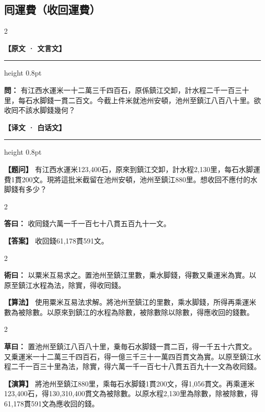 \documentclass[11pt,a4paper]{article}
\newcommand{\ClassicalQuestion}[1]{\par\noindent\textbf{\color{problemcolor}問：}#1\par}
\newcommand{\ClassicalAnswer}[1]{\par\noindent\textbf{\color{answercolor}答曰：}#1\par}
\newcommand{\ClassicalMethod}[1]{\par\noindent\textbf{\color{methodcolor}術曰：}#1\par}
\newcommand{\ClassicalWorking}[1]{\par\noindent\textbf{草曰：}#1\par}
\newcommand{\ModernQuestion}[1]{\par\noindent\textbf{\color{modernlabel}【题问】}#1\par}
\newcommand{\ModernAnswer}[1]{\par\noindent\textbf{\color{answercolor}【答案】}#1\par}
\newcommand{\ModernMethod}[1]{\par\noindent\textbf{\color{methodcolor}【算法】}#1\par}
\newcommand{\ModernWorking}[1]{\par\noindent\textbf{【演算】}#1\par}
\newcommand{\ClassicalHeader}{%
  \begin{center}\textbf{\color{headerclassical}【原文 · 文言文】}\end{center}
  \vspace{-0.5em}
  \hrule height 0.8pt
  \vspace{0.5em}
}
\newcommand{\ModernHeader}{%
  \begin{center}\textbf{\color{headermodern}【译文 · 白话文】}\end{center}
  \vspace{-0.5em}
  \hrule height 0.8pt
  \vspace{0.5em}
}
\begin{document}
\subsection*{\color{sectioncolor}囘運費（收回運費）}

\begin{paracol}{2}

\ClassicalHeader

\ClassicalQuestion{%
有江西水運米一十二萬三千四百石，原係鎮江交卸，計水程二千一百三十里，每石水脚錢一貫二百文。今截上件米就池州安頓，池州至鎮江八百八十里。欲收囘不該水脚錢幾何？}

\switchcolumn

\ModernHeader

\ModernQuestion{%
有江西水運米123,400石，原來到鎮江交卸，計水程2,130里，每石水脚運費1貫200文。現將這批米截留在池州安頓，池州至鎮江880里。想收回不應付的水脚錢有多少？
}

\end{paracol}

\begin{paracol}{2}

\ClassicalAnswer{%
收囘錢六萬一千一百七十八貫五百九十一文。}

\switchcolumn

\ModernAnswer{%
收回錢61,178貫591文。
}

\end{paracol}

\begin{paracol}{2}

\ClassicalMethod{%
以粟米互易求之。置池州至鎮江里數，乗水脚錢，得數又乗運米為實。以原至鎮江水程為法，除實，得收囘錢。}

\switchcolumn

\ModernMethod{%
使用粟米互易法求解。將池州至鎮江的里數，乘水脚錢，所得再乘運米數為被除數。以原來到鎮江的水程為除數，被除數除以除數，得應收回的錢數。
}

\end{paracol}

\begin{paracol}{2}

\ClassicalWorking{%
置池州至鎮江八百八十里，乗毎石水脚錢一貫二百，得一千五十六貫文。又乗運米一十二萬三千四百石，得一億三千三十一萬四百貫文為實。以原至鎮江水程二千一百三十里為法，除實，得六萬一千一百七十八貫五百九十一文為收囘錢。}

\switchcolumn

\ModernWorking{%
將池州至鎮江880里，乘每石水脚錢1貫200文，得1,056貫文。再乘運米123,400石，得130,310,400貫文為被除數。以原水程2,130里為除數，除被除數，得61,178貫591文為應收回的錢。
}

\end{paracol}
\end{document}
